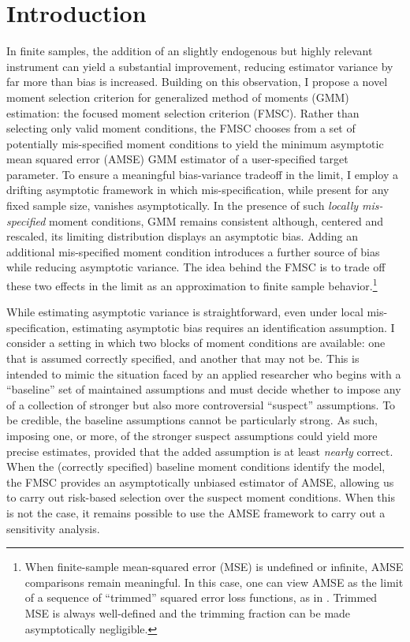 \section{Introduction}
In finite samples, the addition of an slightly endogenous but highly relevant instrument can yield a substantial improvement, reducing estimator variance by far more than bias is increased. 
Building on this observation, I propose a novel moment selection criterion for generalized method of moments (GMM) estimation: the focused moment selection criterion (FMSC). 
Rather than selecting only valid moment conditions, the FMSC chooses from a set of potentially mis-specified moment conditions to yield the minimum asymptotic mean squared error (AMSE) GMM estimator of a user-specified target parameter.
To ensure a meaningful bias-variance tradeoff in the limit, I employ a drifting asymptotic framework in which mis-specification, while present for any fixed sample size, vanishes asymptotically.
In the presence of such \emph{locally mis-specified} moment conditions, GMM remains consistent although, centered and rescaled, its limiting distribution displays an asymptotic bias. Adding an additional mis-specified moment condition introduces a further source of bias while reducing asymptotic variance. 
The idea behind the FMSC is to trade off these two effects in the limit as an approximation to finite sample behavior.\footnote{When finite-sample mean-squared error (MSE) is undefined or infinite, AMSE comparisons remain meaningful. In this case, one can view AMSE as the limit of a sequence of ``trimmed'' squared error loss functions, as in \cite{Hansen2013}. Trimmed MSE is always well-defined and the trimming fraction can be made asymptotically negligible.}

While estimating asymptotic variance is straightforward, even under local mis-specification, estimating asymptotic bias requires an identification assumption. 
I consider a setting in which two blocks of moment conditions are available: one that is assumed correctly specified, and another that may not be.
This is intended to mimic the situation faced by an applied researcher who begins with a ``baseline'' set of maintained assumptions and must decide whether to impose any of a collection of stronger but also more controversial ``suspect'' assumptions.
To be credible, the baseline assumptions cannot be particularly strong.
As such, imposing one, or more, of the stronger suspect assumptions could yield more precise estimates, provided that the added assumption is at least \emph{nearly} correct.
When the (correctly specified) baseline moment conditions identify the model, the FMSC provides an asymptotically unbiased estimator of AMSE, allowing us to carry out risk-based selection over the suspect moment conditions.
When this is not the case, it remains possible to use the AMSE framework to carry out a sensitivity analysis. 

